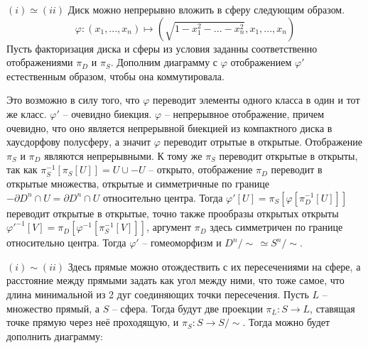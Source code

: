 \documentclass{article}
\begin{document}
\begin{enumerate}
        $(i)\simeq(ii)$ Диск можно непрерывно вложить в сферу следующим образом.
        \[\varphi:(x_1,...,x_n)\mapsto(\sqrt{1-x_1^2-...-x_n^2},x_1,...,x_n)\]
        Пусть факторизация диска и сферы из условия заданны соответственно
        отображениями $\pi_D$ и $\pi_S$. Дополним диаграмму с $\varphi$
        отображением $\varphi'$ естественным образом, чтобы она коммутировала.

        \begin{center}
        \end{center}

        Это возможно в силу того, что $\varphi$ переводит элементы одного
        класса в один и тот же класс. $\varphi'$ – очевидно биекция. $\varphi$
        – непрерывное отображение, причем очевидно, что оно является
        непрерывной биекцией из компактного диска в хаусдорфову полусферу, а
        значит $\varphi$ переводит отрытые в открытые. Отображение $\pi_S$ и
        $\pi_D$ являются непрерывными. К тому же $\pi_S$ переводит открытые в
        открыты, так как $\pi_S^{-1}[\pi_S[U]] = U \cup -U$ – открыто,
        отображение $\pi_D$ переводит в открытые множества, открытые и симметричные по
        границе $-\partial D^n\cap U=\partial D^n\cap U$ относительно центра.
        Тогда $\varphi'[U]=\pi_S[\varphi[\pi_D^{-1}[U]]]$ переводит открытые в
        открытые, точно также прообразы открытых открыты $\varphi'^{-1}[V]=
        \pi_D[\varphi^{-1}[\pi_S^{-1}[V]]]$, аргумент $\pi_D$ здесь симметричен
        по границе относительно центра. Тогда $\varphi'$ – гомеоморфизм и
        $D^n/\!\sim\,\simeq S^n/\!\sim$.

        $(i) \sim (ii)$ Здесь прямые можно отождествить с их пересечениями на
        сфере, а расстояние между прямыми задать как угол между ними, что тоже
        самое, что длина минимальной из 2 дуг соединяющих точки пересечения.
        Пусть $L$ – множество прямый, а $S$ – сфера. Тогда будут две проекции
        $\pi_L: S \longrightarrow L$, ставящая точке прямую через неё проходящую,
        и $\pi_S: S \longrightarrow S/\!\sim$. Тогда можно будет дополнить диаграмму:

        \begin{center}
        \end{center}


\end{enumerate}
\end{document}
